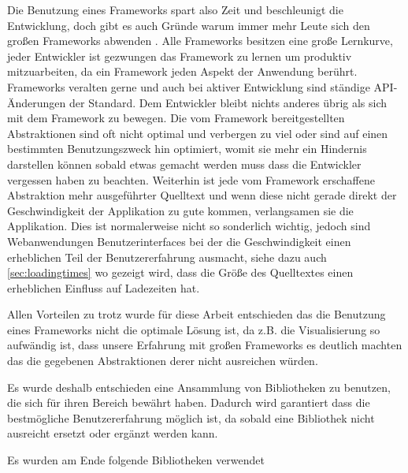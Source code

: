 \documentclass[12pt,twoside]{book}
\begin{document}
Die Benutzung eines Frameworks spart also Zeit und beschleunigt die Entwicklung, doch gibt es auch Gründe warum immer mehr Leute sich den großen Frameworks abwenden \cite{nomoreframeworks, frameworkless}.
Alle Frameworks besitzen eine große Lernkurve, jeder Entwickler ist gezwungen das Framework zu lernen um produktiv mitzuarbeiten, da ein Framework jeden Aspekt der Anwendung berührt. Frameworks veralten gerne und auch bei aktiver Entwicklung sind ständige API-Änderungen der Standard. Dem Entwickler bleibt nichts anderes übrig als sich mit dem Framework zu bewegen. Die vom Framework bereitgestellten Abstraktionen sind oft nicht optimal und verbergen zu viel oder sind auf einen bestimmten Benutzungszweck hin optimiert, womit sie mehr ein Hindernis darstellen können sobald etwas gemacht werden muss dass die Entwickler vergessen haben zu beachten.
Weiterhin ist jede vom Framework erschaffene Abstraktion mehr ausgeführter Quelltext und wenn diese nicht gerade direkt der Geschwindigkeit der Applikation zu gute kommen, verlangsamen sie die Applikation. Dies ist normalerweise nicht so sonderlich wichtig, jedoch sind Webanwendungen Benutzerinterfaces bei der die Geschwindigkeit einen erheblichen Teil der Benutzererfahrung ausmacht, siehe dazu auch \ref{sec:loadingtimes} wo gezeigt wird, dass die Größe des Quelltextes einen erheblichen Einfluss auf Ladezeiten hat.

Allen Vorteilen zu trotz wurde für diese Arbeit entschieden das die Benutzung eines Frameworks nicht die optimale Lösung ist, da z.B. die Visualisierung so aufwändig ist, dass unsere Erfahrung mit großen Frameworks es deutlich machten das die gegebenen Abstraktionen derer nicht ausreichen würden.

Es wurde deshalb entschieden eine Ansammlung von Bibliotheken zu benutzen, die sich für ihren Bereich bewährt haben. Dadurch wird garantiert dass die bestmögliche Benutzererfahrung möglich ist, da sobald eine Bibliothek nicht ausreicht ersetzt oder ergänzt werden kann.

Es wurden am Ende folgende Bibliotheken verwendet
\end{document}
